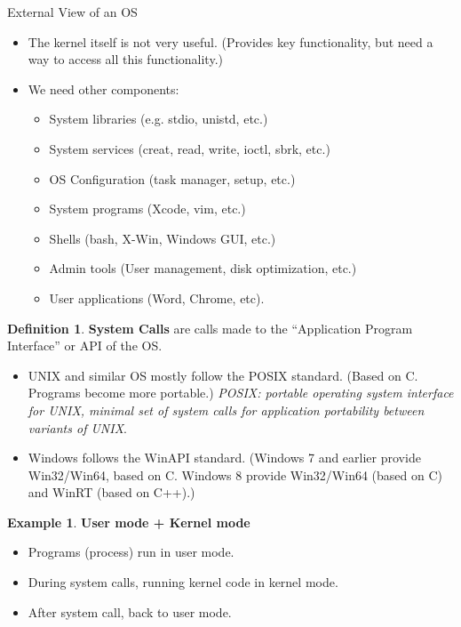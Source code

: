 \documentclass[12pt,a4paper]{article}
\theoremstyle{definition}
\newtheorem{definition}{Definition}[section]
\newtheorem{example}{Example}[section]
\newenvironment{myitemize}
{ \begin{itemize}
    \setlength{\itemsep}{5pt}
    \setlength{\parskip}{0pt}
    \setlength{\parsep}{0pt}     }
{ \end{itemize}                  }
\begin{document}
\begin{tcolorbox}
	\textsf{External View of an OS}
	\begin{myitemize}
		\item The kernel itself is not very useful. (Provides key functionality, but need a way to access all this functionality.)
		\item We need other components:
		\begin{myitemize}
			\item System libraries (e.g. stdio, unistd, etc.)
			\item System services (creat, read, write, ioctl, sbrk, etc.)
			\item OS Configuration (task manager, setup, etc.)
			\item System programs (Xcode, vim, etc.)
			\item Shells (bash, X-Win, Windows GUI, etc.)
			\item Admin tools (User management, disk optimization, etc.)
			\item User applications (Word, Chrome, etc).
		\end{myitemize}
	\end{myitemize}
	
\end{tcolorbox}

\begin{definition}{\textbf{System Calls}}
	are calls made to the “Application Program Interface” or API of the OS.
	\begin{myitemize}
		\item UNIX  and similar OS mostly follow the POSIX standard. (Based on C. Programs become more portable.) \textit{POSIX: portable operating system interface for UNIX, minimal set of system calls for application portability between variants of UNIX}.
		\item Windows follows the WinAPI standard. (Windows 7 and earlier provide Win32/Win64, based on C.
Windows 8 provide Win32/Win64 (based on C) and WinRT (based on C++).)
	\end{myitemize}
\end{definition}

\begin{example}{\textbf{User mode + Kernel mode}}
	\begin{myitemize}
		\item Programs (process) run in user mode.
		\item During system calls, running kernel code in kernel mode.
		\item After system call, back to user mode.
	\end{myitemize}
\end{example}
\end{document}
